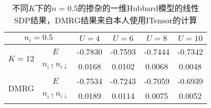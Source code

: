 
\begin{table}
    \caption{不同$K$下的$n=0.5$的掺杂的一维Hubbard模型的线性SDP结果，DMRG结果来自本人使用ITensor的计算}
    \label{tbl:hubbard-1d-doped-linear-sdp}
    \centering
    \begin{tabular}{cccccc}
        \toprule
        \multicolumn{2}{c}{$n_i=0.5$}                                 & $U=4$   & $U=6$   & $U=8$   & $U=10$  \\
        \midrule
        \multirow{2}{*}{$K=12$} & $E$                               & -0.7830 & -0.7593 & -0.7444 & -0.7342  \\
                                & $n_{i \uparrow} n_{i \downarrow}$ &  0.0168 &  0.0102 &  0.0068 &  0.0048  \\
        \midrule
        \multirow{2}{*}{DMRG}  & $E$                               & -0.7534 & -0.7243 & -0.7059 & -0.6939  \\
                                & $n_{i \uparrow} n_{i \downarrow}$ &  0.0189 &  0.0114 &  0.0075 &  0.0052  \\
        \bottomrule
    \end{tabular}
\end{table}
